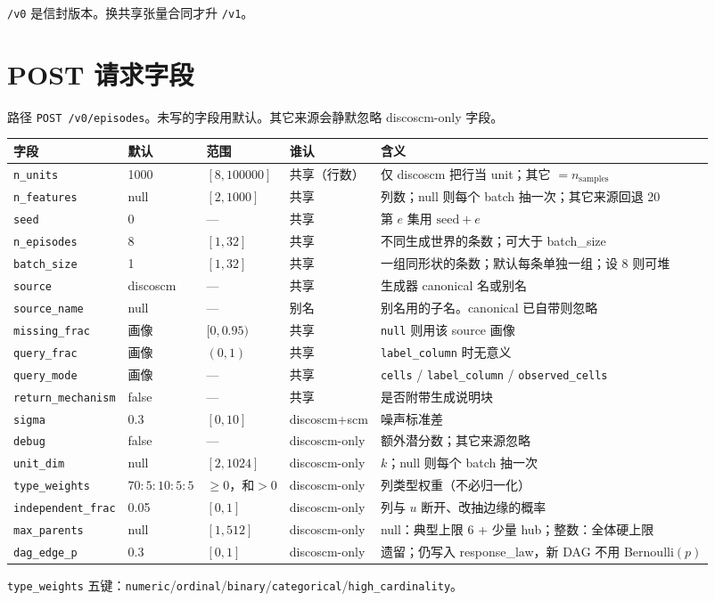\documentclass[11pt,a4paper,fontset=none]{ctexart}
\begin{document}
\texttt{/v0} 是信封版本。换共享张量合同才升 \texttt{/v1}。

\section{POST 请求字段}

路径 \texttt{POST /v0/episodes}。未写的字段用默认。其它来源会静默忽略 discoscm-only 字段。

{\footnotesize
\begin{center}
\begin{tabular}{@{}llp{2.15cm}p{2.35cm}p{4.55cm}@{}}
\toprule
字段 & 默认 & 范围 & 谁认 & 含义 \\
\midrule
\texttt{n\_units} & 1000 & $[8,100000]$ & 共享（行数） & 仅 discoscm 把行当 unit；其它 $=n_{\mathrm{samples}}$ \\
\texttt{n\_features} & null & $[2,1000]$ & 共享 & 列数；null 则每个 batch 抽一次；其它来源回退 20 \\
\texttt{seed} & 0 & --- & 共享 & 第 $e$ 集用 $\mathrm{seed}+e$ \\
\texttt{n\_episodes} & 8 & $[1,32]$ & 共享 & 不同生成世界的条数；可大于 batch\_size \\
\texttt{batch\_size} & 1 & $[1,32]$ & 共享 & 一组同形状的条数；默认每条单独一组；设 8 则可堆 \\
\texttt{source} & discoscm & --- & 共享 & 生成器 canonical 名或别名 \\
\texttt{source\_name} & null & --- & 别名 & 别名用的子名。canonical 已自带则忽略 \\
\texttt{missing\_frac} & 画像 & $[0,0.95)$ & 共享 & \texttt{null} 则用该 source 画像 \\
\texttt{query\_frac} & 画像 & $(0,1)$ & 共享 & \texttt{label\_column} 时无意义 \\
\texttt{query\_mode} & 画像 & --- & 共享 & \texttt{cells} / \texttt{label\_column} / \texttt{observed\_cells} \\
\texttt{return\_mechanism} & false & --- & 共享 & 是否附带生成说明块 \\
\texttt{sigma} & 0.3 & $[0,10]$ & discoscm+scm & 噪声标准差 \\
\texttt{debug} & false & --- & discoscm-only & 额外潜分数；其它来源忽略 \\
\texttt{unit\_dim} & null & $[2,1024]$ & discoscm-only & $k$；null 则每个 batch 抽一次 \\
\texttt{type\_weights} & $70{:}5{:}10{:}5{:}5$ & $\ge 0$，和$>0$ & discoscm-only & 列类型权重（不必归一化） \\
\texttt{independent\_frac} & 0.05 & $[0,1]$ & discoscm-only & 列与 $u$ 断开、改抽边缘的概率 \\
\texttt{max\_parents} & null & $[1,512]$ & discoscm-only & null：典型上限 6 + 少量 hub；整数：全体硬上限 \\
\texttt{dag\_edge\_p} & 0.3 & $[0,1]$ & discoscm-only & 遗留；仍写入 response\_law，新 DAG 不用 Bernoulli$(p)$ \\
\bottomrule
\end{tabular}
\end{center}
}
\texttt{type\_weights} 五键：\texttt{numeric}/\texttt{ordinal}/\texttt{binary}/\texttt{categorical}/\texttt{high\_cardinality}。
\end{document}
